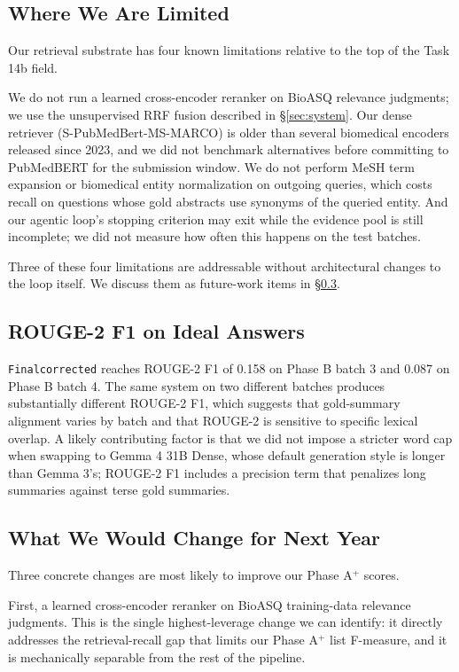 \documentclass[sigconf,natbib=true]{ceurart}
\begin{document}
\subsection{Where We Are Limited}

Our retrieval substrate has four known limitations relative to the top of the Task 14b field.

We do not run a learned cross-encoder reranker on BioASQ relevance judgments; we use the unsupervised RRF fusion described in \S\ref{sec:system}. Our dense retriever (S-PubMedBert-MS-MARCO) is older than several biomedical encoders released since 2023, and we did not benchmark alternatives before committing to PubMedBERT for the submission window. We do not perform MeSH term expansion or biomedical entity normalization on outgoing queries, which costs recall on questions whose gold abstracts use synonyms of the queried entity. And our agentic loop's stopping criterion may exit while the evidence pool is still incomplete; we did not measure how often this happens on the test batches.

Three of these four limitations are addressable without architectural changes to the loop itself. We discuss them as future-work items in \S\ref{subsec:future}.

\subsection{ROUGE-2 F1 on Ideal Answers}

\texttt{Finalcorrected} reaches ROUGE-2 F1 of 0.158 on Phase B batch 3 and 0.087 on Phase B batch 4. The same system on two different batches produces substantially different ROUGE-2 F1, which suggests that gold-summary alignment varies by batch and that ROUGE-2 is sensitive to specific lexical overlap. A likely contributing factor is that we did not impose a stricter word cap when swapping to Gemma 4 31B Dense, whose default generation style is longer than Gemma 3's; ROUGE-2 F1 includes a precision term that penalizes long summaries against terse gold summaries.

\subsection{What We Would Change for Next Year}
\label{subsec:future}

Three concrete changes are most likely to improve our Phase A$^+$ scores.

First, a learned cross-encoder reranker on BioASQ training-data relevance judgments. This is the single highest-leverage change we can identify: it directly addresses the retrieval-recall gap that limits our Phase A$^+$ list F-measure, and it is mechanically separable from the rest of the pipeline.
\end{document}
